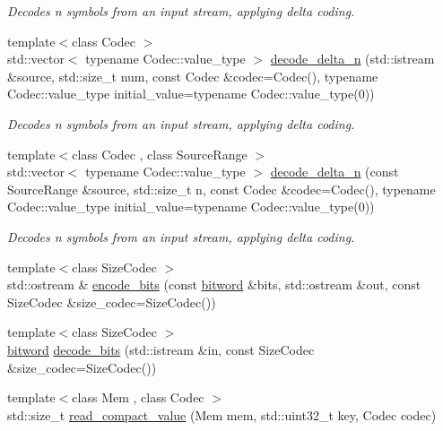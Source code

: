 \begin{DoxyCompactItemize}
\begin{DoxyCompactList}\small\item\em Decodes {\ttfamily n} symbols from an input stream, applying delta coding. \end{DoxyCompactList}\item 
{\footnotesize template$<$class Codec $>$ }\\std\+::vector$<$ typename Codec\+::value\+\_\+type $>$ \mbox{\hyperlink{namespaceirk_a0081bb3a1c56da342a22305aab6e0805}{decode\+\_\+delta\+\_\+n}} (std\+::istream \&source, std\+::size\+\_\+t num, const Codec \&codec=Codec(), typename Codec\+::value\+\_\+type initial\+\_\+value=typename Codec\+::value\+\_\+type(0))
\begin{DoxyCompactList}\small\item\em Decodes {\ttfamily n} symbols from an input stream, applying delta coding. \end{DoxyCompactList}\item 
{\footnotesize template$<$class Codec , class Source\+Range $>$ }\\std\+::vector$<$ typename Codec\+::value\+\_\+type $>$ \mbox{\hyperlink{namespaceirk_ac12ab4662c42689bfed43ea00cca4aa7}{decode\+\_\+delta\+\_\+n}} (const Source\+Range \&source, std\+::size\+\_\+t n, const Codec \&codec=Codec(), typename Codec\+::value\+\_\+type initial\+\_\+value=typename Codec\+::value\+\_\+type(0))
\begin{DoxyCompactList}\small\item\em Decodes {\ttfamily n} symbols from an input stream, applying delta coding. \end{DoxyCompactList}\item 
{\footnotesize template$<$class Size\+Codec $>$ }\\std\+::ostream \& \mbox{\hyperlink{namespaceirk_ad5beaa760e39ac6f6b3c001030388a6f}{encode\+\_\+bits}} (const \mbox{\hyperlink{namespaceirk_a5d1a67079cf6423ecaededebe848f083}{bitword}} \&bits, std\+::ostream \&out, const Size\+Codec \&size\+\_\+codec=Size\+Codec())
\item 
{\footnotesize template$<$class Size\+Codec $>$ }\\\mbox{\hyperlink{namespaceirk_a5d1a67079cf6423ecaededebe848f083}{bitword}} \mbox{\hyperlink{namespaceirk_a9e83666a824362c954771e5fc6a4e0df}{decode\+\_\+bits}} (std\+::istream \&in, const Size\+Codec \&size\+\_\+codec=Size\+Codec())
\item 
{\footnotesize template$<$class Mem , class Codec $>$ }\\std\+::size\+\_\+t \mbox{\hyperlink{namespaceirk_a5a2bb996aa2fce0aa00ae9aafd500bba}{read\+\_\+compact\+\_\+value}} (Mem mem, std\+::uint32\+\_\+t key, Codec codec)

\end{DoxyCompactItemize}
